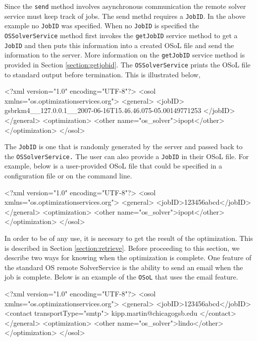 \documentclass[11pt]{article}
\renewcommand{\_}{{\char"5F}}
\renewcommand{\{}{{\char"7B}}
\renewcommand{\}}{{\char"7D}}
\renewcommand{\^}{{\char"0D}}
\renewcommand{\'}{{\char"0D}}
\begin{document}
Since the {\tt send} method involves asynchronous communication the remote solver service must keep track of jobs. The send methd requires a {\tt JobID}. In the above example  no {\tt JobID} was specified. When no {\tt JobID} is specified the {\tt OSSolverService} method first invokes the {\tt getJobID} service method to get a {\tt JobID} and then puts this information into a created OSoL file and send the information to the server. More information on the {\tt getJobID} service method is provided in Section \ref{section:getjobid}.  The {\tt OSSolverService} prints the OSoL file to standard output before termination. This is illustrated below,
\begin{verbatimtab}[4]
<?xml version="1.0" encoding="UTF-8"?>
<osol xmlns="os.optimizationservices.org">
	<general>
		<jobID>
		gsbrkm4__127.0.0.1__2007-06-16T15.46.46.075-05.00149771253
		</jobID>
	</general>
    <optimization>
    	<other name="os_solver">ipopt</other>
    </optimization>
</osol>
\end{verbatimtab}
The {\tt JobID} is one that is randomly generated by the server and passed back to the {\tt OSSolverService.} The user can also provide a {\tt JobID} in their OSoL file. For example, below is a user-provided OSoL file that could be specified in a configuration file or on the command line.
\begin{verbatimtab}[4]
<?xml version="1.0" encoding="UTF-8"?>
<osol xmlns="os.optimizationservices.org">
	<general>
		<jobID>123456abcd</jobID>
	</general>
    <optimization>
    	<other name="os_solver">ipopt</other>
    </optimization>
</osol>
\end{verbatimtab}

In order to be of any use, it is necesary to get the result of the optimization. This is described in Section \ref{section:retrieve}. Before proceeding to this section, we describe two ways for knowing when the optimization is complete. One feature of the standard OS remote SolverService is the ability to send an email when the job is complete. Below is an example of the {\tt OSoL} that uses the email feature.
\begin{verbatimtab}[4]
<?xml version="1.0" encoding="UTF-8"?>
<osol xmlns="os.optimizationservices.org">
 	<general>
 		<jobID>123456abcd</jobID>
 		<contact transportType="smtp">
			kipp.martin@chicagogsb.edu
		</contact>
	</general>
    <optimization>
    	<other name="os_solver">lindo</other>
    </optimization>
</osol>
\end{verbatimtab}
\end{document}
